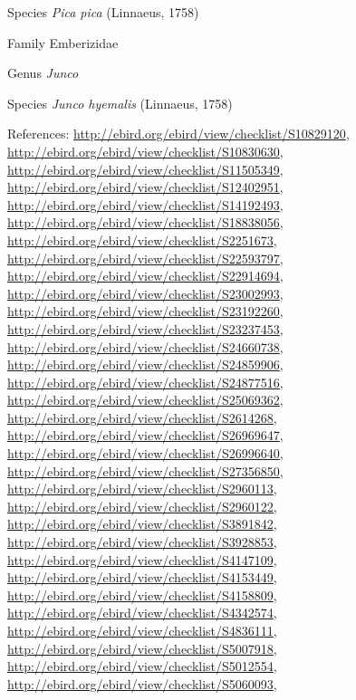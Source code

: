 \documentclass[9pt, article]{memoir}
\begin{document}
\begin{multicols}{2}
\vspace{6pt}\noindent\hspace{36pt}Species \textit{Pica pica} (Linnaeus, 1758)


\vspace{6pt}\noindent\hspace{24pt}Family Emberizidae


\vspace{6pt}\noindent\hspace{30pt}Genus \textit{Junco}


\vspace{6pt}\noindent\hspace{36pt}Species \textit{Junco hyemalis} (Linnaeus, 1758)


\vspace{6pt}References: 
\url{http://ebird.org/ebird/view/checklist/S10829120}, 
\url{http://ebird.org/ebird/view/checklist/S10830630}, 
\url{http://ebird.org/ebird/view/checklist/S11505349}, 
\url{http://ebird.org/ebird/view/checklist/S12402951}, 
\url{http://ebird.org/ebird/view/checklist/S14192493}, 
\url{http://ebird.org/ebird/view/checklist/S18838056}, 
\url{http://ebird.org/ebird/view/checklist/S2251673}, 
\url{http://ebird.org/ebird/view/checklist/S22593797}, 
\url{http://ebird.org/ebird/view/checklist/S22914694}, 
\url{http://ebird.org/ebird/view/checklist/S23002993}, 
\url{http://ebird.org/ebird/view/checklist/S23192260}, 
\url{http://ebird.org/ebird/view/checklist/S23237453}, 
\url{http://ebird.org/ebird/view/checklist/S24660738}, 
\url{http://ebird.org/ebird/view/checklist/S24859906}, 
\url{http://ebird.org/ebird/view/checklist/S24877516}, 
\url{http://ebird.org/ebird/view/checklist/S25069362}, 
\url{http://ebird.org/ebird/view/checklist/S2614268}, 
\url{http://ebird.org/ebird/view/checklist/S26969647}, 
\url{http://ebird.org/ebird/view/checklist/S26996640}, 
\url{http://ebird.org/ebird/view/checklist/S27356850}, 
\url{http://ebird.org/ebird/view/checklist/S2960113}, 
\url{http://ebird.org/ebird/view/checklist/S2960122}, 
\url{http://ebird.org/ebird/view/checklist/S3891842}, 
\url{http://ebird.org/ebird/view/checklist/S3928853}, 
\url{http://ebird.org/ebird/view/checklist/S4147109}, 
\url{http://ebird.org/ebird/view/checklist/S4153449}, 
\url{http://ebird.org/ebird/view/checklist/S4158809}, 
\url{http://ebird.org/ebird/view/checklist/S4342574}, 
\url{http://ebird.org/ebird/view/checklist/S4836111}, 
\url{http://ebird.org/ebird/view/checklist/S5007918}, 
\url{http://ebird.org/ebird/view/checklist/S5012554}, 
\url{http://ebird.org/ebird/view/checklist/S5060093}, 

\end{multicols}
\end{document}
